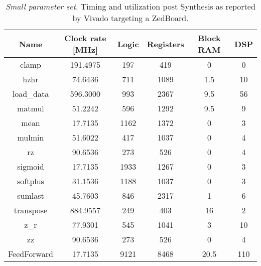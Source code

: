 \begin{table}
\centering
\begin{tabular}{||c c c c c c||} 
 \hline
Name & Clock rate [MHz] & Logic & Registers & Block RAM  & DSP \\ [0.5ex] 
 \hline\hline
clamp & 191.4975 & 197 & 419 & 0 & 0\\
hzhr & 74.6436 & 711 & 1089 & 1.5 & 10\\
load\_data & 596.3000 & 993 & 2367 & 9.5 & 56\\
matmul & 51.2242 & 596 & 1292 & 9.5 & 9\\
mean & 17.7135 & 1162 & 1372 & 0 & 3\\
mulmin & 51.6022 & 417 & 1037 & 0 & 4\\
rz & 90.6536 & 273 & 526 & 0 & 4\\
sigmoid & 17.7135 & 1933 & 1267 & 0 & 3\\
softplus & 31.1536 & 1188 & 1037 & 0 & 3\\
sumlast & 45.7603 & 846 & 2317 & 1 & 6\\
transpose & 884.9557 & 249 & 403 & 16 & 2\\
z\_r & 77.9301 & 545 & 1041 & 3 & 10\\
zz & 90.6536 & 273 & 526 & 0 & 4\\
FeedForward & 17.7135 & 9121 & 8468 & 20.5 & 110\\
 \hline
\end{tabular}
\caption{
\textit{Small parameter set}. Timing and utilization post Synthesis as reported by Vivado targeting a ZedBoard.}
\label{table:utilization_small}
\end{table}



